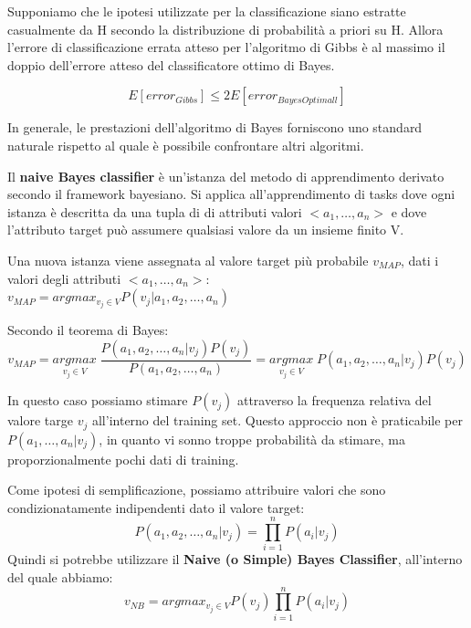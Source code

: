 \documentclass[a4paper]{extarticle}
\begin{document}
Supponiamo che le ipotesi utilizzate per la classificazione siano estratte casualmente da H secondo la distribuzione di probabilità a priori su H. Allora l'errore di classificazione errata atteso per l'algoritmo di Gibbs è al massimo il doppio dell'errore atteso del classificatore ottimo di Bayes.

\begin{equation*}
E[error_{Gibbs}] \leq 2E[error_{BayesOptimall}]
\end{equation*}

In generale, le prestazioni dell'algoritmo di Bayes forniscono uno standard naturale rispetto al quale è possibile confrontare altri algoritmi.

Il \textbf{naive Bayes classifier} è un'istanza del metodo di apprendimento derivato secondo il  framework bayesiano. Si applica all'apprendimento di tasks dove ogni istanza è descritta da una tupla di di attributi valori $<a_1,\dots,a_n>$ e dove l'attributo target può assumere qualsiasi valore da un insieme finito V.

Una nuova istanza viene assegnata al valore target più probabile $v_{MAP}$, dati i valori degli attributi $<a_1, \dots, a_n>$:\\ $v_{MAP} = argmax_{v_j \in V} P(v_j | a_1,a_2,\dots,a_n)$

Secondo il teorema di  Bayes:
\begin{equation*}
v_{MAP} = \underset{v_j\in V}{argmax} \; \dfrac{P(a_1,a_2,\dots,a_n | v_j)P(v_j)}{P(a_1,a_2,\dots,a_n)} =\underset{v_j\in V}{argmax} \; P(a_1, a_2,\dots,a_n | v_j)P(v_j)
\end{equation*}

In questo caso possiamo stimare $P(v_j)$ attraverso la frequenza relativa del valore targe $v_j$ all'interno del training set. Questo approccio non è praticabile per $P(a_1,\dots,a_n|v_j)$, in quanto vi sonno troppe probabilità da stimare, ma proporzionalmente pochi dati di training.

Come ipotesi di semplificazione, possiamo attribuire valori che sono condizionatamente indipendenti dato il valore target:
\begin{equation*}
P(a_1,a_2,\dots,a_n|v_j) = \prod_{i=1}^n P(a_i|v_j)
\end{equation*}
Quindi si potrebbe utilizzare il \textbf{Naive (o Simple) Bayes Classifier}, all'interno del quale abbiamo:
\begin{equation*}
v_{NB} = argmax_{v_j \in V} P(v_j)\prod_{i=1}^n P(a_i|v_j)
\end{equation*}
\end{document}
